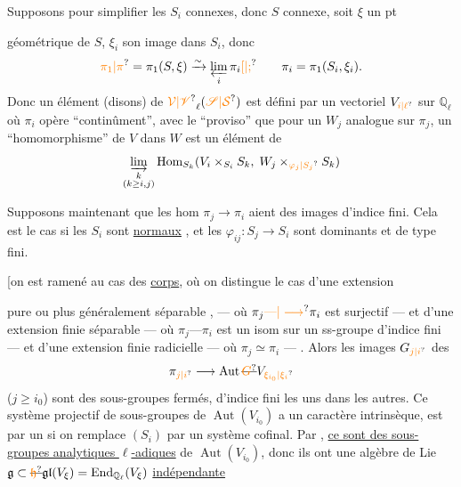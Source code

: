 Supposons pour simplifier les $S_i$ connexes, donc $S$ connexe, soit $\xi$ un pt

géométrique de $S$, $\xi_i$ son image dans $S_i$, donc
\[
\unsure{\pi_1|\pi}=\pi_1(S,\xi)\xrightarrow{\sim}\varprojlim_i\pi_i\unsure{[|;}\qquad \pi_i=\pi_1(S_i,\xi_i).
\]
Donc un élément (disons) de $\unsure{\mathcal V|\mathscr V}_\ell(\unsure{\mathscr S|\mathcal S})$  est défini par un vectoriel $V_{\unsure{i|\ell}}$ sur $\mathbb Q_\ell$ où $\pi_i$ opère ``continûment'', avec le ``proviso'' que pour un $W_j$ analogue sur $\pi_j$, un ``homomorphisme'' de $V$ dans $W$ est un élément de
\[
\varinjlim_{\substack{k\\(k\geq i,j)}}\operatorname{Hom}_{S_k}(V_i\times_{S_i}S_k,\;W_j\times_{\unsure{\varphi_j|S_j}}S_k)
\]

\margin{\rule{0.4pt}{6\baselineskip}}
Supposons maintenant que  les  hom  $\pi_j\longrightarrow\pi_i$ aient des images d'indice fini. Cela est le cas si les $S_i$ sont \uline{normaux} , et les $\varphi_{ij}:S_j\longrightarrow S_i$ sont dominants et  de type fini.

[on est ramené au cas des \uline{corps}, où on distingue le cas d'une extension 

pure ou plus généralement séparable , --- où $\pi_j\unsure{\text{---}|\longrightarrow}\pi_i$ est surjectif --- et d'une extension finie séparable --- où $\pi_j\text{---}\pi_i$ est un isom sur un ss-groupe d'indice fini --- et d'une extension finie radicielle --- où $\pi_j\simeq\pi_i$ --- . Alors les images $G_{\unsure{j|i}}$ des
\[
\pi_{\unsure{j|i}}\longrightarrow\operatorname{Aut}\deleted{\unsure{G}}V_{\unsure{\xi_{i_0}|\xi_i}}
\]
($j\geq i_0$) sont des sous-groupes fermés,  d'indice fini les uns dans les autres. Ce système projectif de sous-groupes de $\operatorname{Aut}(V_{i_0})$  a un caractère intrinsèque, est  par un  si on remplace $(S_i)$ par un système cofinal. Par , \uline{ce sont des sous-groupes analytiques $\ell$-adiques} de $\operatorname{Aut}(V_{i_0})$, donc ils ont une algèbre de Lie $\mathfrak g\subset\deleted{\unsure{\mathfrak h}}\mathfrak{gl}(V_\xi)=\operatorname{End}_{\mathbb Q_\ell}(V_\xi)$ \uline{indépendante}

